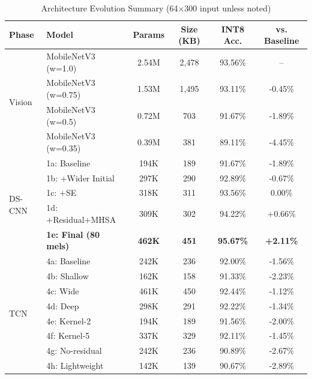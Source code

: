 \documentclass[10pt,a4paper,twoside]{article}
\begin{document}
\begin{table}[h]
	\centering
	\caption{Architecture Evolution Summary (64$\times$300 input unless noted)}
	\label{tab:final_comparison}
	\begin{tabular}{llcccc}
		\toprule
		\textbf{Phase} & \textbf{Model} & \textbf{Params} & \textbf{Size (KB)} & \textbf{INT8 Acc.} & \textbf{vs. Baseline} \\
		\midrule
		\multirow{4}{*}{Vision} & MobileNetV3 (w=1.0) & 2.54M & 2,478 & 93.56\% & -- \\
		& MobileNetV3 (w=0.75) & 1.53M & 1,495 & 93.11\% & -0.45\% \\
		& MobileNetV3 (w=0.5) & 0.72M & 703 & 91.67\% & -1.89\% \\
		& MobileNetV3 (w=0.35) & 0.39M & 381 & 89.11\% & -4.45\% \\
		\midrule
		\multirow{5}{*}{DS-CNN} & 1a: Baseline & 194K & 189 & 91.67\% & -1.89\% \\
		& 1b: +Wider Initial & 297K & 290 & 92.89\% & -0.67\% \\
		& 1c: +SE & 318K & 311 & 93.56\% & 0.00\% \\
		& 1d: +Residual+MHSA & 309K & 302 & 94.22\% & +0.66\% \\
		& \textbf{1e: Final (80 mels)} & \textbf{462K} & \textbf{451} & \textbf{95.67\%} & \textbf{+2.11\%} \\
		\midrule
		\multirow{8}{*}{TCN} & 4a: Baseline & 242K & 236 & 92.00\% & -1.56\% \\
		& 4b: Shallow & 162K & 158 & 91.33\% & -2.23\% \\
		& 4c: Wide & 461K & 450 & 92.44\% & -1.12\% \\
		& 4d: Deep & 298K & 291 & 92.22\% & -1.34\% \\
		& 4e: Kernel-2 & 194K & 189 & 91.56\% & -2.00\% \\
		& 4f: Kernel-5 & 337K & 329 & 92.11\% & -1.45\% \\
		& 4g: No-residual & 242K & 236 & 90.89\% & -2.67\% \\
		& 4h: Lightweight & 142K & 139 & 90.67\% & -2.89\% \\
		\bottomrule
	\end{tabular}
\end{table}
\end{document}
